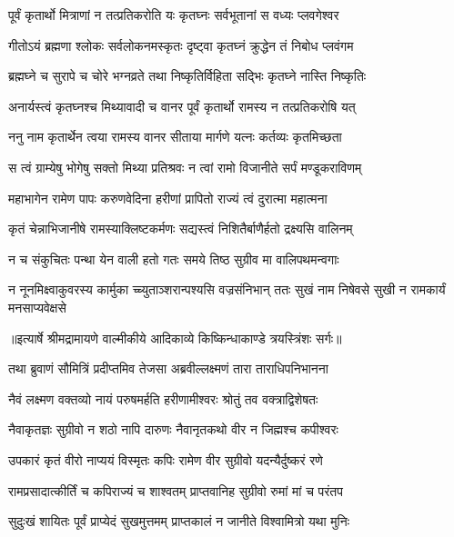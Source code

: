 \twolineshloka
{पूर्वं कृतार्थो मित्राणां न तत्प्रतिकरोति यः}
{कृतघ्नः सर्वभूतानां स वध्यः प्लवगेश्वर} %

\twolineshloka
{गीतोऽयं ब्रह्मणा श्लोकः सर्वलोकनमस्कृतः}
{दृष्ट्वा कृतघ्नं क्रुद्धेन तं निबोध प्लवंगम} %

\twolineshloka
{ब्रह्मघ्ने च सुरापे च चोरे भग्नव्रते तथा}
{निष्कृतिर्विहिता सद्भिः कृतघ्ने नास्ति निष्कृतिः} %

\twolineshloka
{अनार्यस्त्वं कृतघ्नश्च मिथ्यावादी च वानर}
{पूर्वं कृतार्थो रामस्य न तत्प्रतिकरोषि यत्} %

\twolineshloka
{ननु नाम कृतार्थेन त्वया रामस्य वानर}
{सीताया मार्गणे यत्नः कर्तव्यः कृतमिच्छता} %

\twolineshloka
{स त्वं ग्राम्येषु भोगेषु सक्तो मिथ्या प्रतिश्रवः}
{न त्वां रामो विजानीते सर्पं मण्डूकराविणम्} %

\twolineshloka
{महाभागेन रामेण पापः करुणवेदिना}
{हरीणां प्रापितो राज्यं त्वं दुरात्मा महात्मना} %

\twolineshloka
{कृतं चेन्नाभिजानीषे रामस्याक्लिष्टकर्मणः}
{सद्यस्त्वं निशितैर्बाणैर्हतो द्रक्ष्यसि वालिनम्} %

\twolineshloka
{न च संकुचितः पन्था येन वाली हतो गतः}
{समये तिष्ठ सुग्रीव मा वालिपथमन्वगाः} %

\fourlineindentedshloka
{न नूनमिक्ष्वाकुवरस्य कार्मुका}
{च्च्युताञ्शरान्पश्यसि वज्रसंनिभान्}
{ततः सुखं नाम निषेवसे सुखी}
{ न रामकार्यं मनसाप्यवेक्षसे} %


{॥इत्यार्षे श्रीमद्रामायणे वाल्मीकीये आदिकाव्ये किष्किन्धाकाण्डे त्रयस्त्रिंशः सर्गः॥}


\twolineshloka
{तथा ब्रुवाणं सौमित्रिं प्रदीप्तमिव तेजसा}
{अब्रवील्लक्ष्मणं तारा ताराधिपनिभानना} %

\twolineshloka
{नैवं लक्ष्मण वक्तव्यो नायं परुषमर्हति}
{हरीणामीश्वरः श्रोतुं तव वक्त्राद्विशेषतः} %

\twolineshloka
{नैवाकृतज्ञः सुग्रीवो न शठो नापि दारुणः}
{नैवानृतकथो वीर न जिह्मश्च कपीश्वरः} %

\twolineshloka
{उपकारं कृतं वीरो नाप्ययं विस्मृतः कपिः}
{रामेण वीर सुग्रीवो यदन्यैर्दुष्करं रणे} %

\twolineshloka
{रामप्रसादात्कीर्तिं च कपिराज्यं च शाश्वतम्}
{प्राप्तवानिह सुग्रीवो रुमां मां च परंतप} %

\twolineshloka
{सुदुःखं शायितः पूर्वं प्राप्येदं सुखमुत्तमम्}
{प्राप्तकालं न जानीते विश्वामित्रो यथा मुनिः} %

